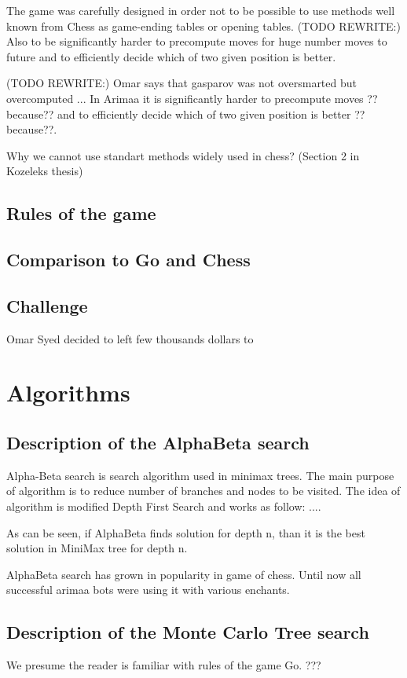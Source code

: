 \documentclass[12pt,titlepage,fleqn]{report}
\begin{document}
The game was carefully designed in order not to be possible to use methods
well known from Chess as game-ending tables or opening tables. (TODO
REWRITE:) Also to be significantly harder to precompute moves for huge
number moves to future and to efficiently decide which of two given position
is better.

(TODO REWRITE:) Omar says that gasparov was not oversmarted but overcomputed ...
In Arimaa it is significantly harder to precompute moves ??because?? and to
efficiently decide which of two given position is better ??because??.

Why we cannot use standart methods widely used in chess? (Section 2 in Kozeleks thesis)

\section{Rules of the game}

\section{Comparison to Go and Chess}

\section{Challenge}
Omar Syed decided to left few thousands dollars to


\chapter{Algorithms}

\section{Description of the AlphaBeta search}
Alpha-Beta search is search algorithm used in minimax trees. The main purpose
of algorithm is to reduce number of branches and nodes to be visited. The idea
of algorithm is modified Depth First Search and works as follow:
....

As can be seen, if AlphaBeta finds solution for depth n, than it is the best
solution in MiniMax tree for depth n.

AlphaBeta search has grown in popularity in game of chess. Until now all
successful arimaa bots were using it with various enchants.


\section{Description of the Monte Carlo Tree search}
We presume the reader is familiar with rules of the game Go. {???}
\end{document}
